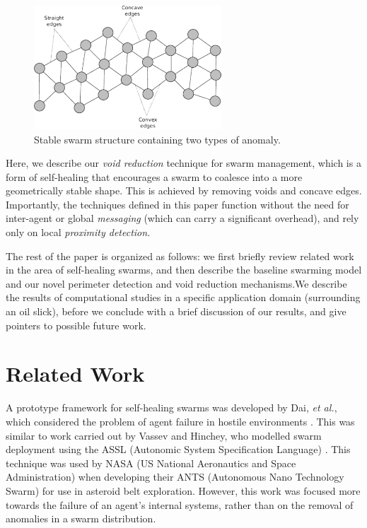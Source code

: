 \documentclass[letterpaper]{article}
\begin{document}
\begin{figure}
\begin{center}
\includegraphics[width=7cm]{figures/SwarmStableShape1}
\end{center}
\caption{Stable swarm structure containing two types of anomaly. \label{concave:SwarmStableShape1}}
\end{figure}

Here, we describe our \textit{void reduction} technique for swarm management, which is a form of self-healing that encourages a swarm to coalesce into a more geometrically stable shape. This is achieved by removing voids and concave edges. Importantly, the techniques defined in this paper function without the need for inter-agent or global {\it messaging} (which can carry a significant overhead), and rely only on local {\it proximity detection}.

The rest of the paper is organized as follows: we first briefly review related work in the area of self-healing swarms, and then describe the baseline swarming model and our novel perimeter detection and void reduction mechanisms.We describe the results of computational studies in a specific application domain (surrounding an oil slick), before we conclude with a brief discussion of our results, and give pointers to possible future work.

\section{Related Work \label{sec:RelatedWork}} 

A prototype framework for self-healing swarms was developed by Dai, {\it et al.}, which considered the problem of agent failure in hostile environments \citep{DHMRZ:06}. This was similar to work carried out by Vassev and Hinchey, who modelled swarm deployment using the ASSL (Autonomic System Specification Language) \citep{VH:09}. This technique was used by NASA (US National Aeronautics and Space Administration) when developing their ANTS (Autonomous Nano Technology Swarm) for use in asteroid belt exploration. However, this work was focused more towards the failure of an agent's internal systems, rather than on the removal of anomalies in a swarm distribution. 
\end{document}
